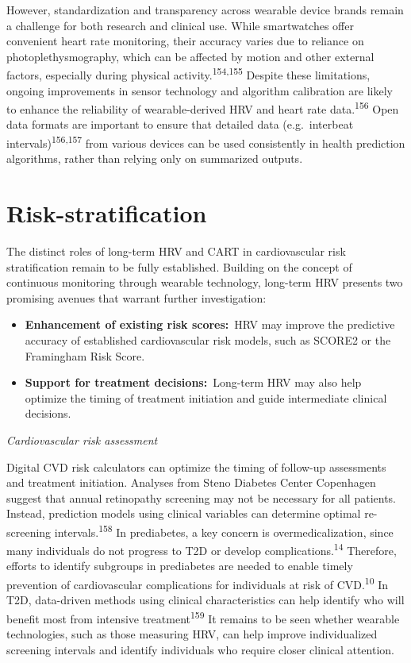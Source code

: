 \documentclass[
  letterpaper,
  headsepline=true,
  open=any]{scrbook}
\begin{document}
However, standardization and transparency across wearable device brands
remain a challenge for both research and clinical use. While
smartwatches offer convenient heart rate monitoring, their accuracy
varies due to reliance on photoplethysmography, which can be affected by
motion and other external factors, especially during physical
activity.\textsuperscript{154,155} Despite these limitations, ongoing
improvements in sensor technology and algorithm calibration are likely
to enhance the reliability of wearable-derived HRV and heart rate
data.\textsuperscript{156} Open data formats are important to ensure
that detailed data (e.g.~interbeat intervals)\textsuperscript{156,157}
from various devices can be used consistently in health prediction
algorithms, rather than relying only on summarized outputs.

\hypertarget{risk-stratification-1}{%
\section{Risk-stratification}\label{risk-stratification-1}}

The distinct roles of long-term HRV and CART in cardiovascular risk
stratification remain to be fully established. Building on the concept
of continuous monitoring through wearable technology, long-term HRV
presents two promising avenues that warrant further investigation:

\begin{itemize}
\item
  \textbf{Enhancement of existing risk scores:}~HRV may improve the
  predictive accuracy of established cardiovascular risk models, such as
  SCORE2 or the Framingham Risk Score.
\item
  \textbf{Support for treatment decisions:}~Long-term HRV may also help
  optimize the timing of treatment initiation and guide intermediate
  clinical decisions.
\end{itemize}

\emph{Cardiovascular risk assessment}

Digital CVD risk calculators can optimize the timing of follow-up
assessments and treatment initiation. Analyses from Steno Diabetes
Center Copenhagen suggest that annual retinopathy screening may not be
necessary for all patients. Instead, prediction models using clinical
variables can determine optimal re-screening
intervals.\textsuperscript{158} In prediabetes, a key concern is
overmedicalization, since many individuals do not progress to T2D or
develop complications.\textsuperscript{14} Therefore, efforts to
identify subgroups in prediabetes are needed to enable timely prevention
of cardiovascular complications for individuals at risk of
CVD.\textsuperscript{10} In T2D, data-driven methods using clinical
characteristics can help identify who will benefit most from intensive
treatment\textsuperscript{159} It remains to be seen whether wearable
technologies, such as those measuring HRV, can help improve
individualized screening intervals and identify individuals who require
closer clinical attention.
\end{document}
